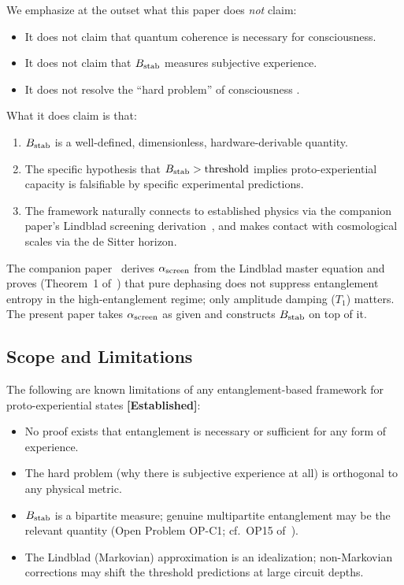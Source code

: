\documentclass[12pt,letterpaper]{article}
\theoremstyle{definition}
\theoremstyle{remark}
\newcommand{\established}{\textbf{[Established]}}
\newcommand{\ascreen}{\alpha_{\rm screen}}
\newcommand{\Bstab}{B_{\rm stab}}
\begin{document}
We emphasize at the outset what this paper does \emph{not} claim:
\begin{itemize}[noitemsep]
\item It does not claim that quantum coherence is necessary for consciousness.
\item It does not claim that $\Bstab$ measures subjective experience.
\item It does not resolve the ``hard problem'' of consciousness \cite{chalmers1995}.
\end{itemize}

What it does claim is that:
\begin{enumerate}[noitemsep]
\item $\Bstab$ is a well-defined, dimensionless, hardware-derivable quantity.
\item The specific hypothesis that $\Bstab > \text{threshold}$ implies
      proto-experiential capacity is falsifiable by specific experimental predictions.
\item The framework naturally connects to established physics via the companion
      paper's Lindblad screening derivation~\cite{companion}, and makes contact
      with cosmological scales via the de Sitter horizon.
\end{enumerate}

The companion paper~\cite{companion} derives $\ascreen$ from the Lindblad master
equation and proves (Theorem~1 of~\cite{companion}) that pure dephasing does not
suppress entanglement entropy in the high-entanglement regime; only amplitude
damping ($T_1$) matters.
The present paper takes $\ascreen$ as given and constructs $\Bstab$ on top of it.

\subsection{Scope and Limitations}

The following are known limitations of any entanglement-based framework for
proto-experiential states \established{}:
\begin{itemize}[noitemsep]
\item No proof exists that entanglement is necessary or sufficient for any form
      of experience.
\item The hard problem (why there is subjective experience at all) is orthogonal
      to any physical metric.
\item $\Bstab$ is a bipartite measure; genuine multipartite entanglement may be
      the relevant quantity (Open Problem OP-C1; cf.\ OP15 of~\cite{companion}).
\item The Lindblad (Markovian) approximation is an idealization; non-Markovian
      corrections may shift the threshold predictions at large circuit depths.
\end{itemize}
\end{document}
